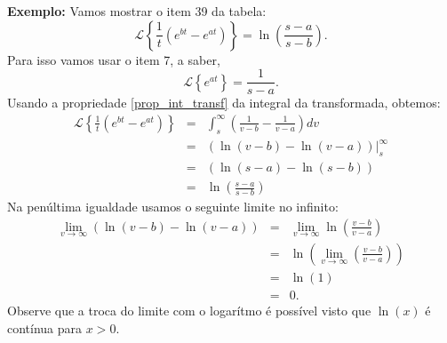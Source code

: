 \documentclass[a4paper,10pt]{book}
\begin{document}
{\bf Exemplo:} Vamos mostrar o item 39 da tabela:
 \begin{equation}
 \mathcal{L}\left\{\frac{1}{t}\left(e^{bt}-e^{at}\right)\right\}=\ln\left(\frac{s-a}{s-b}\right).
 \end{equation}
 Para isso vamos usar o item 7, a saber,
 \begin{equation*}
 \mathcal{L}\left\{e^{at}\right\}=\frac{1}{s-a}.
 \end{equation*}
 Usando a propriedade \ref{prop_int_transf} da integral da transformada, obtemos:
 \begin{eqnarray*}
 \mathcal{L}\left\{\frac{1}{t}\left(e^{bt}-e^{at}\right)\right\}&=&\int_s^\infty \left(\frac{1}{v-b}-\frac{1}{v-a}\right)dv\\
 &=& \left.\left(\ln(v-b)-\ln(v-a)\right)\right|_s^\infty\\
 &=& \left(\ln(s-a)-\ln(s-b)\right)\\
 &=&\ln\left(\frac{s-a}{s-b}\right)
 \end{eqnarray*}
 Na penúltima igualdade usamos o seguinte limite no infinito:
 \begin{eqnarray*}
 \lim_{v\to\infty} \left(\ln(v-b)-\ln(v-a)\right)&=&\lim_{v\to\infty} \ln\left(\frac{v-b}{v-a}\right)\\
 &=& \ln\left(\lim_{v\to\infty}\left(\frac{v-b}{v-a}\right)\right)\\
 &=& \ln\left(1\right)\\
 &=&0.
 \end{eqnarray*}
 Observe que a troca do limite com o logarítmo é possível visto que $\ln(x)$ é contínua para $x>0$.
\end{document}
